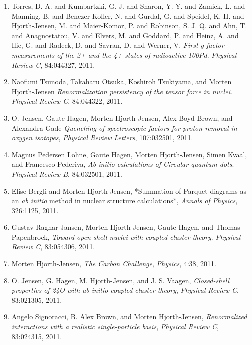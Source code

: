 \documentclass[%
oneside,                 %
final,                   %
10pt]{article}
\begin{document}
\begin{enumerate}
\item Torres, D. A. and Kumbartzki, G. J. and Sharon, Y. Y. and Zamick, 	L. and Manning, B. and Benczer-Koller, N. and Gurdal, G. and Speidel, 	K.-H. and Hjorth-Jensen, M. and Maier-Komor, P. and Robinson, S. J. Q. and Ahn, T. and Anagnostatou, V. and Elvers, M. and Goddard, 	P. and Heinz, A. and Ilie, G. and Radeck, D. and Savran, D. and Werner, V.  \emph{First g-factor measurements of the 2+ and the 4+ states of radioactive 100Pd}.  \emph{Physical Review C}, 84:044327, 2011.  

\item Naofumi Tsunoda, Takaharu Otsuka, Koshiroh Tsukiyama, and Morten Hjorth-Jensen  \emph{Renormalization persistency of the tensor force in nuclei}.  \emph{Physical Review C}, 84:044322, 2011.  

\item O. Jensen, Gaute Hagen, Morten Hjorth-Jensen, Alex Boyd Brown, and Alexandra Gade  \emph{Quenching of spectroscopic factors for proton removal in oxygen isotopes},   \emph{Physical Review Letters}, 107:032501, 2011. 

\item Magnus Pedersen Lohne, Gaute Hagen, Morten Hjorth-Jensen, Simen Kvaal, and Francesco Pederiva,  \emph{Ab initio calculations of Circular quantum dots}.  \emph{Physical Review B}, 84:032501, 2011.    

\item Elise Bergli and Morten Hjorth-Jensen,  *Summation of Parquet diagrams as an \emph{ab initio} method in nuclear structure calculations*,  \emph{Annals of Physics}, 326:1125, 2011.   

\item Gustav Ragnar Jansen, Morten Hjorth-Jensen, Gaute Hagen, and Thomas Papenbrock,  \emph{Toward open-shell nuclei with coupled-cluster theory}.  \emph{Physical Review C}, 83:054306, 2011. 

\item Morten Hjorth-Jensen,  \emph{The Carbon Challenge},  \emph{Physics}, 4:38, 2011.  

\item O. Jensen, G. Hagen, M. Hjorth-Jensen, and J. S. Vaagen,  \emph{Closed-shell properties of 24O with ab initio coupled-cluster theory},  \emph{Physical Review C}, 83:021305, 2011. 

\item Angelo Signoracci, B. Alex Brown, and Morten Hjorth-Jensen,  \emph{Renormalized interactions with a realistic single-particle   basis},  \emph{Physical Review C}, 83:024315, 2011.   


\end{enumerate}
\end{document}
